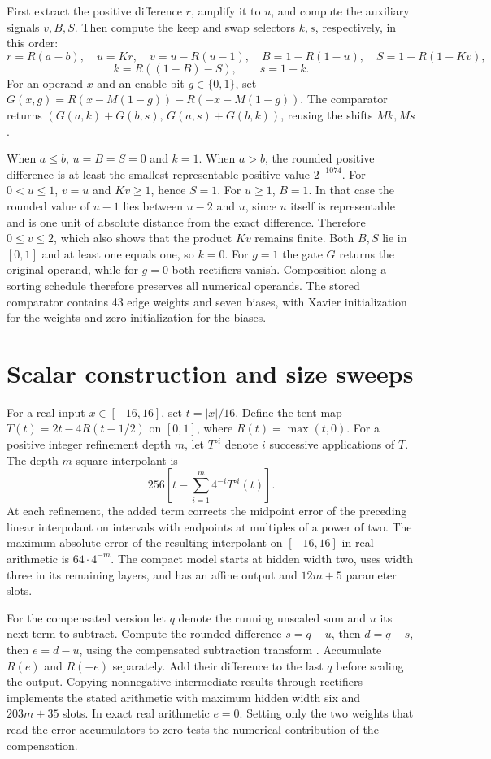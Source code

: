 First extract the positive difference \(r\), amplify it to \(u\), and compute the auxiliary signals \(v,B,S\). Then compute the keep and swap selectors \(k,s\), respectively, in this order:
\[
 r=R(a-b),\quad u=Kr,\quad v=u-R(u-1),\quad B=1-R(1-u),
 \quad S=1-R(1-Kv),
\]
\[
                k=R((1-B)-S),\qquad s=1-k.
\]
For an operand \(x\) and an enable bit \(g\in\{0,1\}\), set
\(G(x,g)=R(x-M(1-g))-R(-x-M(1-g))\). The comparator returns
\((G(a,k)+G(b,s),\,G(a,s)+G(b,k))\), reusing the shifts \(Mk,Ms\).

When \(a\le b\), \(u=B=S=0\) and \(k=1\). When \(a>b\), the rounded positive difference is at least the smallest representable positive value \(2^{-1074}\). For \(0<u\le1\), \(v=u\) and \(Kv\ge1\), hence \(S=1\). For \(u\ge1\), \(B=1\). In that case the rounded value of \(u-1\) lies between \(u-2\) and \(u\), since \(u\) itself is representable and is one unit of absolute distance from the exact difference. Therefore \(0\le v\le2\), which also shows that the product \(Kv\) remains finite. Both \(B,S\) lie in \([0,1]\) and at least one equals one, so \(k=0\). For \(g=1\) the gate \(G\) returns the original operand, while for \(g=0\) both rectifiers vanish. Composition along a sorting schedule therefore preserves all numerical operands. The stored comparator contains 43 edge weights and seven biases, with Xavier initialization for the weights and zero initialization for the biases.

\section{Scalar construction and size sweeps}\label{app:square}
For a real input \(x\in[-16,16]\), set \(t=|x|/16\). Define the tent map \(T(t)=2t-4R(t-1/2)\) on \([0,1]\), where \(R(t)=\max(t,0)\). For a positive integer refinement depth \(m\), let \(T^{\circ i}\) denote \(i\) successive applications of \(T\). The depth-\(m\) square interpolant is
\[
               256\left[t-\sum_{i=1}^m4^{-i}T^{\circ i}(t)\right].
\]
At each refinement, the added term corrects the midpoint error of the preceding linear interpolant on intervals with endpoints at multiples of a power of two. The maximum absolute error of the resulting interpolant on \([-16,16]\) in real arithmetic is \(64\cdot4^{-m}\). The compact model starts at hidden width two, uses width three in its remaining layers, and has an affine output and \(12m+5\) parameter slots.

For the compensated version let \(q\) denote the running unscaled sum and \(u\) its next term to subtract. Compute the rounded difference \(s=q-u\), then \(d=q-s\), then \(e=d-u\), using the compensated subtraction transform \cite{dekker1971}. Accumulate \(R(e)\) and \(R(-e)\) separately. Add their difference to the last \(q\) before scaling the output. Copying nonnegative intermediate results through rectifiers implements the stated arithmetic with maximum hidden width six and \(203m+35\) slots. In exact real arithmetic \(e=0\). Setting only the two weights that read the error accumulators to zero tests the numerical contribution of the compensation.

